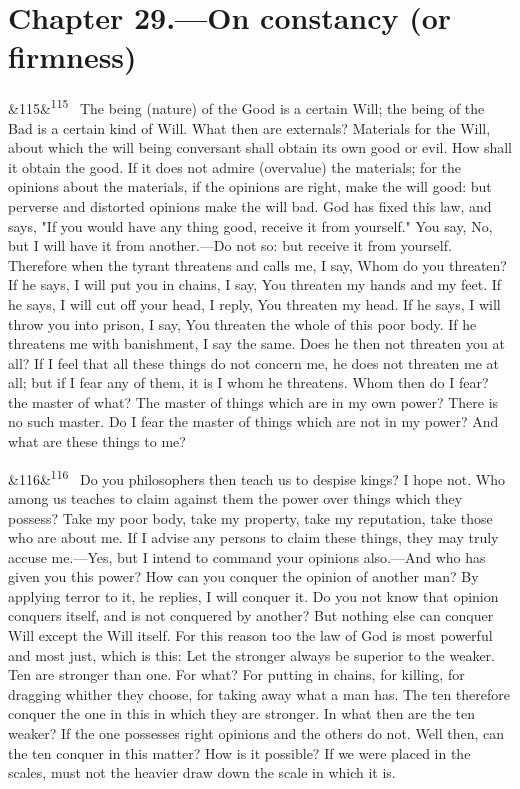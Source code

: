 \documentclass[12pt]{article}
\newcommand{\para}[1][]{\par\noindent\ifx&#1&\else\textsuperscript{\footnotesize #1}~\fi}
\begin{document}
\section*{Chapter 29.---On constancy (or firmness)}

\para[115] The being (nature) of the Good is a certain Will; the being of the Bad is a certain kind of Will. What then are externals? Materials for the Will, about which the will being conversant shall obtain its own good or evil. How shall it obtain the good. If it does not admire (overvalue) the materials; for the opinions about the materials, if the opinions are right, make the will good: but perverse and distorted opinions make the will bad. God has fixed this law, and says, "If you would have any thing good, receive it from yourself." You say, No, but I will have it from another.—Do not so: but receive it from yourself. Therefore when the tyrant threatens and calls me, I say, Whom do you threaten? If he says, I will put you in chains, I say, You threaten my hands and my feet. If he says, I will cut off your head, I reply, You threaten my head. If he says, I will throw you into prison, I say, You threaten the whole of this poor body. If he threatens me with banishment, I say the same. Does he then not threaten you at all? If I feel that all these things do not concern me, he does not threaten me at all; but if I fear any of them, it is I whom he threatens. Whom then do I fear? the master of what? The master of things which are in my own power? There is no such master. Do I fear the master of things which are not in my power? And what are these things to me?

\para[116] Do you philosophers then teach us to despise kings? I hope not. Who among us teaches to claim against them the power over things which they possess? Take my poor body, take my property, take my reputation, take those who are about me. If I advise any persons to claim these things, they may truly accuse me.—Yes, but I intend to command your opinions also.—And who has given you this power? How can you conquer the opinion of another man? By applying terror to it, he replies, I will conquer it. Do you not know that opinion conquers itself, and is not conquered by another? But nothing else can conquer Will except the Will itself. For this reason too the law of God is most powerful and most just, which is this: Let the stronger always be superior to the weaker. Ten are stronger than one. For what? For putting in chains, for killing, for dragging whither they choose, for taking away what a man has. The ten therefore conquer the one in this in which they are stronger. In what then are the ten weaker? If the one possesses right opinions and the others do not. Well then, can the ten conquer in this matter? How is it possible? If we were placed in the scales, must not the heavier draw down the scale in which it is.
\end{document}
